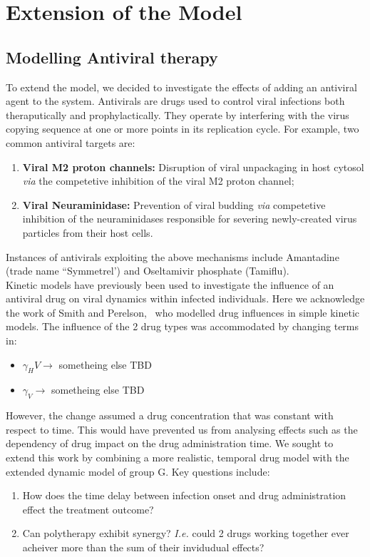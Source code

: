 \documentclass[a4paper, 12pt]{report}
\begin{document}
\chapter{Extension of the Model}
\section{Modelling Antiviral therapy}
To extend the model, we decided to investigate the effects of adding an antiviral agent to the system.
Antivirals are drugs used to control viral infections both theraputically and prophylactically. They operate by interfering with the virus copying sequence at one or more points in its replication cycle. For example, two common antiviral targets are:
\begin{enumerate}
\item \textbf{Viral M2 proton channels:} Disruption of viral unpackaging in host cytosol \textit{via} the competetive inhibition of the viral M2 proton channel;~\cite{}
\item \textbf{Viral Neuraminidase:} Prevention of viral budding \textit{via} competetive inhibition of the neuraminidases responsible for severing newly-created virus particles from their host cells.\cite{}  
\end{enumerate}
Instances of antivirals exploiting the above mechanisms include Amantadine (trade name ``Symmetrel') and Oseltamivir phosphate (Tamiflu).\\

Kinetic models have previously been used to investigate the influence of an antiviral drug on viral dynamics within infected individuals. Here we acknowledge the work of Smith and Perelson,~\cite{Smith} who modelled drug influences in simple kinetic models.
The influence of the 2 drug types was accommodated by changing terms in:
\begin{itemize}
\item  $\gamma_HV \rightarrow $ sometheing else TBD
\item $\gamma_V \rightarrow $ sometheing else TBD
\end{itemize}
However, the change assumed a drug concentration that was constant with respect to time. This would have prevented us from analysing effects such as the dependency of drug impact on the drug administration time.
We sought to extend this work by combining a more realistic, temporal drug model with the extended dynamic model of group G. 
Key questions include:
\begin{enumerate}
\item How does the time delay between infection onset and drug administration effect the treatment outcome?
\item Can polytherapy exhibit synergy? \textit{I.e.} could 2 drugs working together ever acheiver more than the sum of their invidudual effects?
\end{enumerate}
\end{document}
